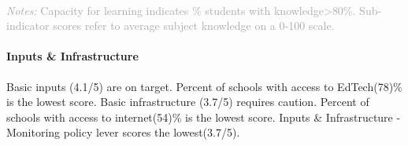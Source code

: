 \documentclass[twocolumn]{article}
\let\oldparagraph\paragraph
\renewcommand{\paragraph}[1]{\oldparagraph{#1}\mbox{}}
\begin{document}
\begin{table}[H]
\\
{\scriptsize
    \textcolor{darkgray}{\textit{Notes:} Capacity for learning indicates \% students with knowledge\textgreater{80\%}. Sub-indicator scores refer to average subject knowledge on a 0-100 scale.}
  }

\end{table}
\raggedbottom

\hypertarget{inputs-infrastructure}{%
\paragraph{\texorpdfstring{\textbf{Inputs \&
Infrastructure}}{Inputs \& Infrastructure}}\label{inputs-infrastructure}}

Basic inputs (4.1/5) are on target. Percent of schools with access to
EdTech(78)\% is the lowest score. Basic infrastructure (3.7/5) requires
caution. Percent of schools with access to internet(54)\% is the lowest
score. Inputs \& Infrastructure - Monitoring policy lever scores the
lowest(3.7/5).
\end{document}
